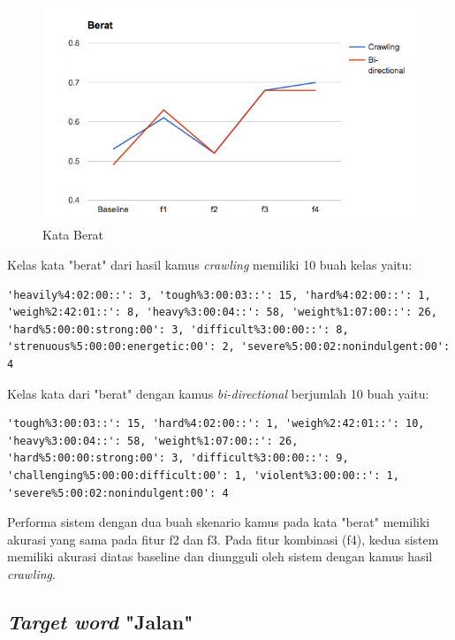 \begin{figure}
	\centering
	\includegraphics[width=1\linewidth]{adit_pics/berat.png}
	\caption{Kata Berat}
	\label{fig:berat}
\end{figure}

Kelas kata "berat" dari hasil kamus \textit{crawling} memiliki 10 buah kelas yaitu:
\begin{lstlisting}
'heavily%4:02:00::': 3, 'tough%3:00:03::': 15, 'hard%4:02:00::': 1, 'weigh%2:42:01::': 8, 'heavy%3:00:04::': 58, 'weight%1:07:00::': 26, 'hard%5:00:00:strong:00': 3, 'difficult%3:00:00::': 8, 'strenuous%5:00:00:energetic:00': 2, 'severe%5:00:02:nonindulgent:00': 4
\end{lstlisting}
Kelas kata dari "berat" dengan kamus \textit{bi-directional} berjumlah 10 buah yaitu:
\begin{lstlisting}
'tough%3:00:03::': 15, 'hard%4:02:00::': 1, 'weigh%2:42:01::': 10, 'heavy%3:00:04::': 58, 'weight%1:07:00::': 26, 'hard%5:00:00:strong:00': 3, 'difficult%3:00:00::': 9, 'challenging%5:00:00:difficult:00': 1, 'violent%3:00:00::': 1, 'severe%5:00:02:nonindulgent:00': 4
\end{lstlisting}

Performa sistem dengan dua buah skenario kamus pada kata "berat" memiliki akurasi yang sama pada fitur f2 dan f3. Pada fitur kombinasi (f4), kedua sistem memiliki akurasi diatas baseline dan diungguli oleh sistem dengan kamus hasil \textit{crawling}.

\subsection{\textit{Target word} "Jalan"}

